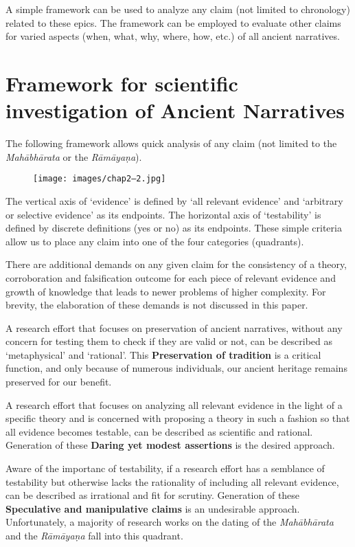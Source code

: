 A simple framework can be used to analyze any claim (not limited to chronology) related to these epics. The framework can be employed to evaluate other claims for varied aspects (when, what, why, where, how, etc.) of all ancient narratives.


\section*{Framework for scientific investigation of Ancient Narratives}

The following framework allows quick analysis of any claim (not limited to the \textit{Mahābhārata} or the \textit{Rāmāyaṇa}).

\begin{figure}
\texttt{[image: images/chap2–2.jpg]}
\end{figure}

The vertical axis of ‘evidence’ is defined by ‘all relevant evidence’ and ‘arbitrary or selective evidence’ as its endpoints. The horizontal axis of ‘testability’ is defined by discrete definitions (yes or no) as its endpoints. These simple criteria allow us to place any claim into one of the four categories (quadrants).

There are additional demands on any given claim for the consistency of a theory, corroboration and falsification outcome for each piece of relevant evidence and growth of knowledge that leads to newer problems of higher complexity. For brevity, the elaboration of these demands is not discussed in this paper.

A research effort that focuses on preservation of ancient narratives, without any concern for testing them to check if they are valid or not, can be described as ‘metaphysical’ and ‘rational’. This \textbf{Preservation of tradition} is a critical function, and only because of numerous individuals, our ancient heritage remains preserved for our benefit.

A research effort that focuses on analyzing all relevant evidence in the light of a specific theory and is concerned with proposing a theory in such a fashion so that all evidence becomes testable, can be described as scientific and rational. Generation of these \textbf{Daring yet modest assertions} is the desired approach.

Aware of the importanc of testability, if a research effort has a semblance of testability but otherwise lacks the rationality of including all relevant evidence, can be described as irrational and fit for scrutiny. Generation of these \textbf{Speculative and manipulative claims} is an undesirable approach. Unfortunately, a majority of research works on the dating of the \textit{Mahābhārata} and the \textit{Rāmāyaṇa} fall into this quadrant.

